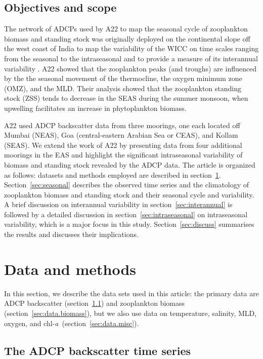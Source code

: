 \documentclass[authoryear,review,11pt]{elsarticle}
\newcommand{\chla}{chl-{\emph{a}}}
\begin{document}
\subsection{Objectives and scope}
\label{sec:intro.scope}

The network of ADCPs used by A22 to map the seasonal cycle of zooplankton biomass and standing stock was originally deployed on the continental slope off the west coast of India to map the variability of the WICC on time scales ranging from the seasonal to the intraseasonal and to provide a measure of its interannual variability \citep{amol2014observed, chaudhuri2020observed}. A22 showed that the zooplankton peaks (and troughs) are influenced by the the seasonal movement of the thermocline, the oxygen minimum zone (OMZ), and the MLD. Their analysis showed that the zooplankton standing stock (ZSS) tends to decrease in the SEAS during the summer monsoon, when upwelling facilitates an increase in phytoplankton biomass.

A22 used ADCP backscatter data from three moorings, one each located off Mumbai (NEAS), Goa (central-eastern Arabian Sea or CEAS), and Kollam (SEAS).  We extend the work of A22 by presenting data from four additional moorings in the EAS and highlight the significant intraseasonal variability of biomass and standing stock revealed by the ADCP data. The article is organized as follows: datasets and methods employed are described in section~\ref{sec:data}. Section~\ref{sec:seasonal} describes the observed time series and the climatology of zooplankton biomass and standing stock and their seasonal cycle and variability. A brief discussion on interannual variability in section~\ref{sec:interannual} is followed by a detailed discussion in section~\ref{sec:intraseasonal} on intraseasonal variability, which is a major focus in this study. Section~\ref{sec:discuss} summarises the results and discusses their implications.


\section{Data and methods}
\label{sec:data}

In this section, we describe the data sets used in this article: the primary data are ADCP backscatter (section~\ref{sec:data.bs}) and zooplankton biomass (section~\ref{sec:data.biomass}), but we also use data on temperature, salinity, MLD, oxygen, and \chla\ (section~\ref{sec:data.misc}).

\subsection{The ADCP backscatter time series}
\label{sec:data.bs}
\end{document}
